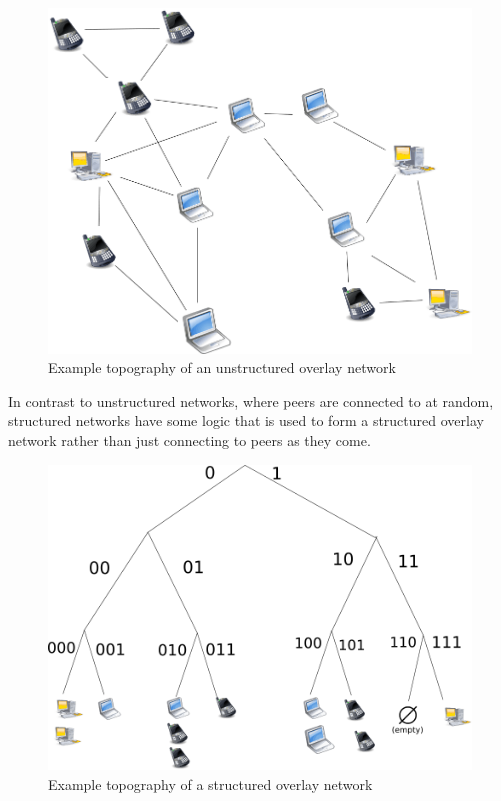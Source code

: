 \begin{figure}
    \includegraphics[width=\textwidth]{pictures/unstructured.png}
    \caption{Example topography of an unstructured overlay network}
    \label{Unstructured Overlay Network}
\end{figure}

In contrast to unstructured networks, where peers are connected to at random, structured networks have some logic that is used to form a structured overlay network rather than just connecting to peers as they come.

\begin{figure}
    \includegraphics[width=\textwidth]{pictures/structured.png}
    \caption{Example topography of a structured overlay network}
    \label{Structured Overlay Network}
\end{figure}

